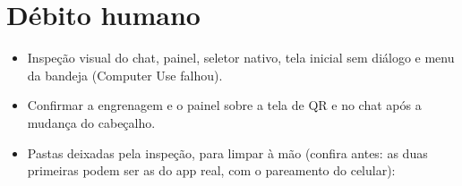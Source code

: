\documentclass[11pt,a4paper]{article}
\begin{document}
\section{Débito humano}
\begin{itemize}
  \item Inspeção visual do chat, painel, seletor nativo, tela inicial sem
        diálogo e menu da bandeja (Computer Use falhou).
  \item Confirmar a engrenagem e o painel sobre a tela de QR e no chat após a
        mudança do cabeçalho.
  \item Pastas deixadas pela inspeção, para limpar à mão (confira antes: as
        duas primeiras podem ser as do app real, com o pareamento do celular):
        \begin{itemize}
          \item \path{%
          \item \path{%
          \item \path{%
        \end{itemize}
\end{itemize}
\end{document}
